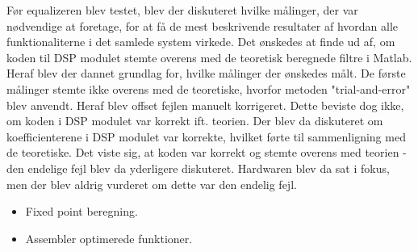 Før equalizeren blev testet, blev der diskuteret hvilke målinger, der var nødvendige at foretage, for at få de mest beskrivende resultater af hvordan alle funktionaliterne i det samlede system virkede.
Det ønskedes at finde ud af, om koden til DSP modulet stemte overens med de teoretisk beregnede filtre i Matlab. 
Heraf blev der dannet grundlag for, hvilke målinger der ønskedes målt.
De første målinger stemte ikke overens med de teoretiske, hvorfor metoden "trial-and-error" blev anvendt. 
Heraf blev offset fejlen manuelt korrigeret.
Dette beviste dog ikke, om koden i DSP modulet var korrekt ift. teorien.
Der blev da diskuteret om koefficienterene i DSP modulet var korrekte, hvilket førte til sammenligning med de teoretiske.
Det viste sig, at koden var korrekt og stemte overens med teorien - den endelige fejl blev da yderligere diskuteret.
Hardwaren blev da sat i fokus, men der blev aldrig vurderet om dette var den endelig fejl.





 


\begin{itemize}
\item Fixed point beregning.
\item Assembler optimerede funktioner.
\end{itemize}